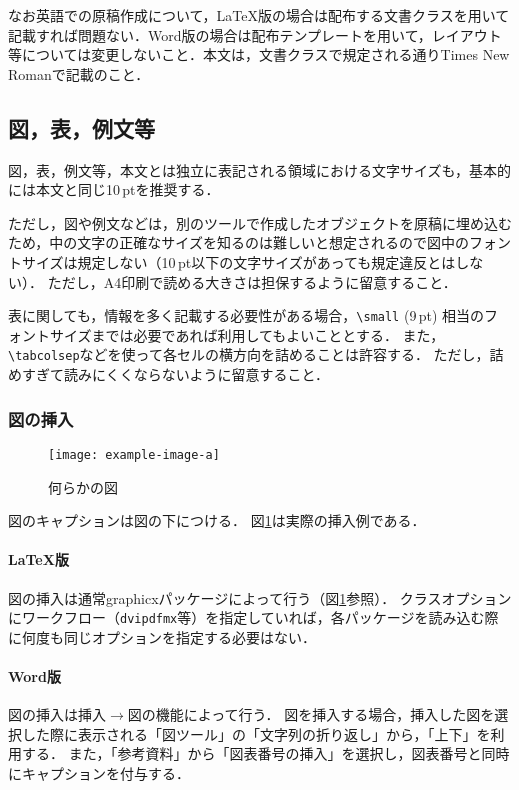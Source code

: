 \documentclass[
  platex, dvipdfmx,  %
]{nlp2024}
\newcommand{\pkg}[1]{\textsf{#1}}
\newcommand{\code}[1]{\texttt{#1}}
\begin{document}
なお英語での原稿作成について，LaTeX版の場合は配布する文書クラスを用いて記載すれば問題ない．Word版の場合は配布テンプレートを用いて，レイアウト等については変更しないこと．本文は，文書クラスで規定される通りTimes New Romanで記載のこと．



\subsection{図，表，例文等}
図，表，例文等，本文とは独立に表記される領域における文字サイズも，基本的には本文と同じ10\,ptを推奨する．

ただし，図や例文などは，別のツールで作成したオブジェクトを原稿に埋め込むため，中の文字の正確なサイズを知るのは難しいと想定されるので図中のフォントサイズは規定しない（10\,pt以下の文字サイズがあっても規定違反とはしない）．
ただし，A4印刷で読める大きさは担保するように留意すること．

表に関しても，情報を多く記載する必要性がある場合，\verb|\small| (9\,pt) 相当のフォントサイズまでは必要であれば利用してもよいこととする．
また，\verb|\tabcolsep|などを使って各セルの横方向を詰めることは許容する．
ただし，詰めすぎて読みにくくならないように留意すること．


\subsubsection{図の挿入}
%
\begin{figure}[t]
\centering
\texttt{[image: example-image-a]}
\caption{何らかの図}
\label{fig:sample}
\end{figure}

図のキャプションは図の下につける．
図\ref{fig:sample}は実際の挿入例である．


\paragraph{LaTeX版}
図の挿入は通常\pkg{graphicx}パッケージによって行う（図\ref{fig:sample}参照）．
クラスオプションにワークフロー（\code{dvipdfmx}等）を指定していれば，各パッケージを読み込む際に何度も同じオプションを指定する必要はない．


\paragraph{Word版}
図の挿入は挿入$\xrightarrow{}$図の機能によって行う．
図を挿入する場合，挿入した図を選択した際に表示される「図ツール」の「文字列の折り返し」から，「上下」を利用する．
また，「参考資料」から「図表番号の挿入」を選択し，図表番号と同時にキャプションを付与する．
\end{document}

